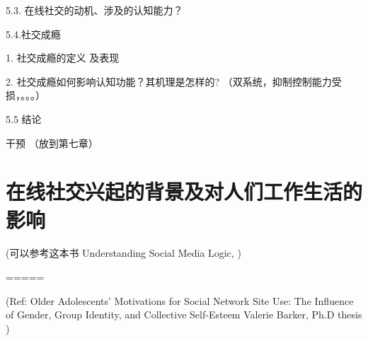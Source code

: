 
\color{olive}



5.3. 在线社交的动机、涉及的认知能力？

5.4.社交成瘾

   1. 社交成瘾的定义 及表现

    2. 社交成瘾如何影响认知功能？其机理是怎样的? （双系统，抑制控制能力受损，。。。）

5.5 结论

干预 （放到第七章）



\section{ 在线社交兴起的背景及对人们工作生活的影响  }


 (可以参考这本书 Understanding Social Media Logic, \cite{DijckPoell2013})

=====

(Ref: Older Adolescents’ Motivations for Social Network Site Use: The Influence of Gender, Group Identity, and Collective Self-Esteem
Valerie Barker, Ph.D thesis )


